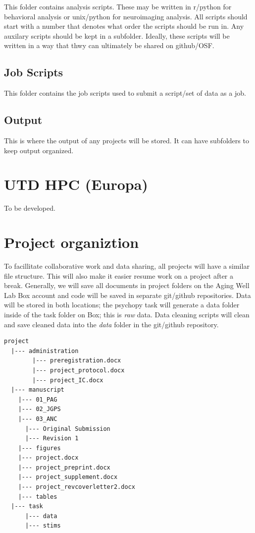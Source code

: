 \documentclass[
]{book}
\begin{document}
This folder contains analysis scripts. These may be written in r/python for behavioral analysis or unix/python for neuroimaging analysis. All scripts should start with a number that denotes what order the scripts should be run in. Any auxilary scripts should be kept in a subfolder. Ideally, these scripts will be written in a way that thwy can ultimately be shared on github/OSF.

\hypertarget{job-scripts}{%
\subsection{Job Scripts}\label{job-scripts}}

This folder contains the job scripts used to submit a script/set of data as a job.

\hypertarget{output}{%
\subsection{Output}\label{output}}

This is where the output of any projects will be stored. It can have subfolders to keep output organized.

\hypertarget{utd-hpc-europa}{%
\section{UTD HPC (Europa)}\label{utd-hpc-europa}}

To be developed.

\hypertarget{project-organiztion}{%
\section{Project organiztion}\label{project-organiztion}}

To facillitate collaborative work and data sharing, all projects will have a similar file structure. This will also make it easier resume work on a project after a break. Generally, we will save all documents in project folders on the Aging Well Lab Box account and code will be saved in separate git/github repositories. Data will be stored in both locations; the psychopy task will generate a data folder inside of the task folder on Box; this is \emph{raw} data. Data cleaning scripts will clean and save cleaned data into the \emph{data} folder in the git/github repository.

\begin{verbatim}
project
  |--- administration 
        |--- preregistration.docx
        |--- project_protocol.docx
        |--- project_IC.docx
  |--- manuscript
    |--- 01_PAG
    |--- 02_JGPS
    |--- 03_ANC
      |--- Original Submission
      |--- Revision 1
    |--- figures
    |--- project.docx
    |--- project_preprint.docx
    |--- project_supplement.docx
    |--- project_revcoverletter2.docx
    |--- tables
  |--- task
      |--- data
      |--- stims
\end{verbatim}
\end{document}
